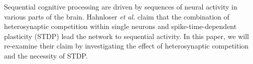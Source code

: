 Sequential cognitive processing are driven by sequences of neural activity in various parts of the brain. 
Hahnloser \textit{et al.} claim that the combination of heterosynaptic competition within single neurons and spike-time-dependent plasticity (STDP) lead the network to sequential activity. In this paper, we will re-examine their claim by investigating the effect of heterosynaptic competition and the necessity of  STDP.
